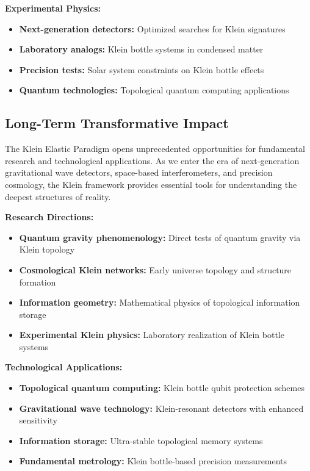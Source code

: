 \documentclass[12pt,a4paper]{article}
\begin{document}
\textbf{Experimental Physics:}
\begin{itemize}
    \item \textbf{Next-generation detectors:} Optimized searches for Klein signatures
    \item \textbf{Laboratory analogs:} Klein bottle systems in condensed matter
    \item \textbf{Precision tests:} Solar system constraints on Klein bottle effects
    \item \textbf{Quantum technologies:} Topological quantum computing applications
\end{itemize}

\subsection{Long-Term Transformative Impact}

The Klein Elastic Paradigm opens unprecedented opportunities for fundamental research and technological applications. As we enter the era of next-generation gravitational wave detectors, space-based interferometers, and precision cosmology, the Klein framework provides essential tools for understanding the deepest structures of reality.

\textbf{Research Directions:}
\begin{itemize}
    \item \textbf{Quantum gravity phenomenology:} Direct tests of quantum gravity via Klein topology
    \item \textbf{Cosmological Klein networks:} Early universe topology and structure formation
    \item \textbf{Information geometry:} Mathematical physics of topological information storage
    \item \textbf{Experimental Klein physics:} Laboratory realization of Klein bottle systems
\end{itemize}

\textbf{Technological Applications:}
\begin{itemize}
    \item \textbf{Topological quantum computing:} Klein bottle qubit protection schemes
    \item \textbf{Gravitational wave technology:} Klein-resonant detectors with enhanced sensitivity
    \item \textbf{Information storage:} Ultra-stable topological memory systems
    \item \textbf{Fundamental metrology:} Klein bottle-based precision measurements
\end{itemize}
\end{document}

